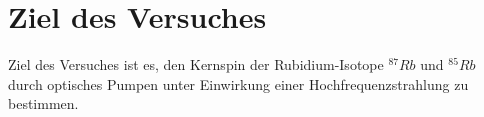 \section{Ziel des Versuches}
\label{sec:versuchsziel}

Ziel des Versuches ist es, den Kernspin der Rubidium-Isotope $^{87}Rb$ und $^{85}Rb$ durch optisches Pumpen unter Einwirkung einer Hochfrequenzstrahlung zu bestimmen.